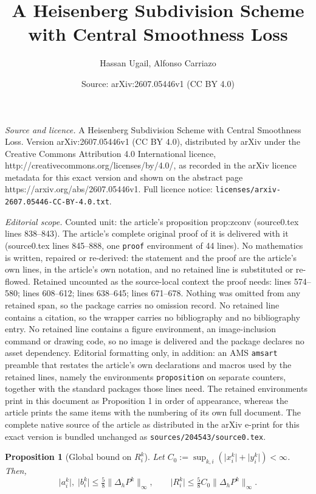 \documentclass[10pt,a4paper]{amsart}
\title{A Heisenberg Subdivision Scheme with Central Smoothness Loss}
\author{Hassan Ugail, Alfonso Carriazo}
\date{Source: arXiv:2607.05446v1 (CC BY 4.0)}
\newtheorem{proposition}{Proposition}
\newcommand{\Dh}{\Delta_h}
\newcommand{\abs}[1]{\lvert #1 \rvert}
\newcommand{\norm}[1]{\lVert #1 \rVert}
\begin{document}
\maketitle

\noindent\emph{Source and licence.} A Heisenberg Subdivision Scheme with Central Smoothness Loss. Version arXiv:2607.05446v1 (CC BY 4.0), distributed by arXiv under the Creative Commons Attribution 4.0 International licence, http://creativecommons.org/licenses/by/4.0/, as recorded in the arXiv licence metadata for this exact version and shown on the abstract page https://arxiv.org/abs/2607.05446v1. Full licence notice: \texttt{licenses/arxiv-2607.05446-CC-BY-4.0.txt}.\par\smallskip

\noindent\textit{Editorial scope.} Counted unit: the article's proposition prop:zconv (source0.tex lines 838--843). The article's complete original proof of it is delivered with it (source0.tex lines 845--888, one \texttt{proof} environment of 44 lines). No mathematics is written, repaired or re-derived: the statement and the proof are the article's own lines, in the article's own notation, and no retained line is substituted or re-flowed.  Retained uncounted as the source-local context the proof needs: lines 574--580; lines 608--612; lines 638--645; lines 671--678.  Nothing was omitted from any retained span, so the package carries no omission record.  No retained line contains a citation, so the wrapper carries no bibliography and no bibliography entry.  No retained line contains a figure environment, an image-inclusion command or drawing code, so no image is delivered and the package declares no asset dependency.  Editorial formatting only, in addition: an AMS \texttt{amsart} preamble that restates the article's own declarations and macros used by the retained lines, namely the environments \texttt{proposition} on separate counters, together with the standard packages those lines need.  The retained environments print in this document as Proposition 1 in order of appearance, whereas the article prints the same items with the numbering of its own full document.  The complete native source of the article as distributed in the arXiv e-print for this exact version is bundled unchanged as \texttt{sources/204543/source0.tex}.
\begin{proposition}[Global bound on $R_i^k$]\label{prop:correctionbounds}
Let $C_0:=\sup_{k,i}(\abs{x_i^k}+\abs{y_i^k})<\infty$. Then,
\begin{equation}\label{eq:globalbound}
  \abs{a_i^k},\;\abs{b_i^k} \leq \tfrac{5}{8}\norm{\Dh P^k}_\infty, \qquad
  \abs{R_i^k} \leq \tfrac{5}{8}C_0\norm{\Dh P^k}_\infty.
\end{equation}
\end{proposition}
\end{document}
